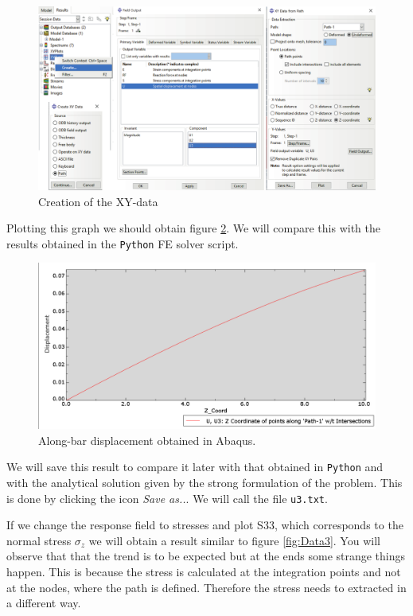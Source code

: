 \documentclass[spanish,a4paper,12pt]{article}
\begin{document}
\begin{figure}[h!tp]
\centering
\includegraphics[scale=0.45]{capturas/U-data.pdf}
\caption{Creation of the XY-data}
\label{fig:Data1}%
\end{figure}

Plotting this graph we should obtain figure \ref{fig:Data2}. We will compare this with the results obtained in the \texttt{Python} FE solver script.
\clearpage
\begin{figure}[h!tp]
\centering
\includegraphics[scale=0.45]{capturas/U-data2.png}
\caption{Along-bar displacement obtained in Abaqus.}
\label{fig:Data2}%
\end{figure}

We will save this result to compare it later with that obtained in \texttt{Python} and with the analytical solution given by the strong formulation of the problem. This is done by clicking the icon \emph{Save as..}. We will call the file \texttt{u3.txt}. 

If we change the response field to stresses and plot S33, which corresponds to the normal stress $\sigma_z$ we will obtain a result similar to figure \ref{fig:Data3}.  You will observe that that the trend is to be expected but at the ends some strange things happen. This is because the stress is calculated at the integration points and not at the nodes, where the path is defined. Therefore the stress needs to extracted in a different way.
\end{document}

